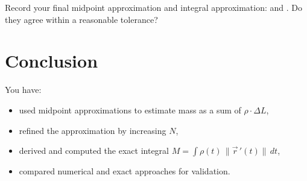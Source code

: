 \documentclass{ximera}
\begin{document}
\begin{problem}
Record your final midpoint approximation and integral approximation:  and . Do they agree within a reasonable tolerance? 
\end{problem}

\section*{Conclusion}

You have:
\begin{itemize}
\item used midpoint approximations to estimate mass as a sum of \(\rho \cdot \Delta L\),
\item refined the approximation by increasing \(N\),
\item derived and computed the exact integral \(M=\int \rho(t)\,\|\vec r\,'(t)\|\,dt\),
\item compared numerical and exact approaches for validation.
\end{itemize}
\end{document}
